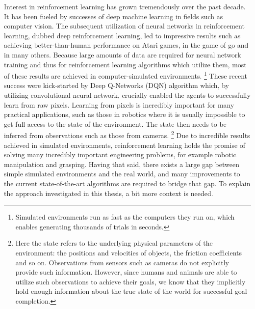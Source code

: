 Interest in reinforcement learning has grown tremendously over the past decade.
It has been fueled by successes of deep machine learning in fields such as computer vision.
The subsequent utilization of neural networks in reinforcement learning,
dubbed deep reinforcement learning,
led to impressive results such as achieving better-than-human
performance on Atari games, in the game of go and in many others.
Because large amounts of data are required for neural network training
and thus for reinforcement learning algorithms which utilize them,
most of these results are achieved in computer-simulated environments.
\footnote{Simulated environments run as fast as the computers they run on,
		which enables generating thousands of trials in seconds.}
These recent success were kick-started by Deep Q-Networks (DQN) algorithm which,
by utilizing convolutional neural network, crucially enabled the agents to successfully learn from raw pixels.
Learning from pixels is incredibly important for many practical applications,
such as those in robotics
where it is usually impossible to get full access to the state of the environment.
The state then needs to be inferred from observations such as those from cameras.
\footnote{Here the state refers to the underlying physical parameters of the environment:
the positions and velocities of objects, the friction coefficients and so on.
Observations from sensors such as cameras do not explicitly provide such information.
However, since humans and animals are able to utilize such observations to achieve their
goals, we know that they implicitly hold enough information about the true state
of the world for successful goal completion.}
Due to incredible results achieved in simulated environments,
reinforcement learning holds the promise of solving
many incredibly important engineering problems, for example robotic manipulation
and grasping.
Having that said, there exists a large gap between simple simulated environments and
the real world,
and many improvements to the current state-of-the-art algorithms are required to
bridge that gap.
To explain the approach investigated in this thesis,
a bit more context is needed.


